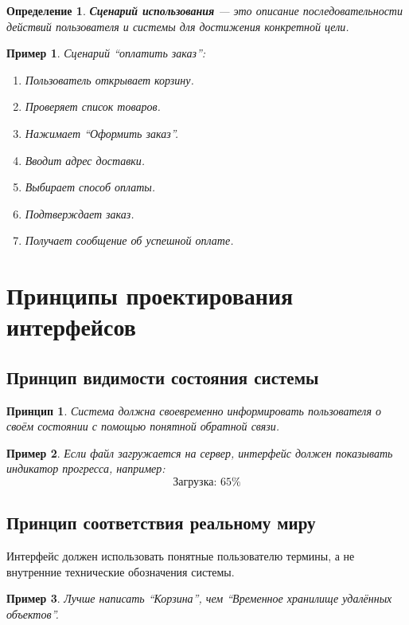 \documentclass[12pt,a4paper]{article}
\newtheorem{definition}{Определение}
\newtheorem{principle}{Принцип}
\newtheorem{example}{Пример}
\begin{document}
\begin{definition}
\textbf{Сценарий использования} --- это описание последовательности действий пользователя и системы для достижения конкретной цели.
\end{definition}

\begin{example}
Сценарий ``оплатить заказ'':
\begin{enumerate}
    \item Пользователь открывает корзину.
    \item Проверяет список товаров.
    \item Нажимает ``Оформить заказ''.
    \item Вводит адрес доставки.
    \item Выбирает способ оплаты.
    \item Подтверждает заказ.
    \item Получает сообщение об успешной оплате.
\end{enumerate}
\end{example}

\section{Принципы проектирования интерфейсов}

\subsection{Принцип видимости состояния системы}

\begin{principle}
Система должна своевременно информировать пользователя о своём состоянии с помощью понятной обратной связи.
\end{principle}

\begin{example}
Если файл загружается на сервер, интерфейс должен показывать индикатор прогресса, например:
\[
\text{Загрузка: } 65\%
\]
\end{example}

\subsection{Принцип соответствия реальному миру}

Интерфейс должен использовать понятные пользователю термины, а не внутренние технические обозначения системы.

\begin{example}
Лучше написать ``Корзина'', чем ``Временное хранилище удалённых объектов''.
\end{example}
\end{document}
